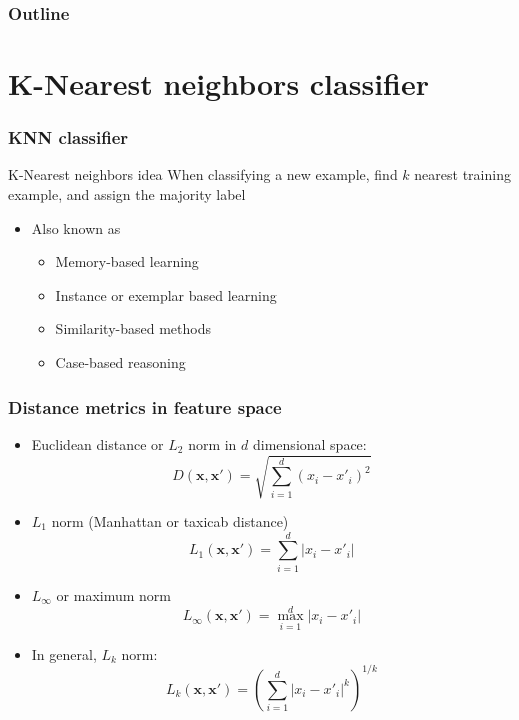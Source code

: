 \documentclass{beamer}
\author[Stroppa and Chrupala]{Grzegorz Chrupa{\l}a and Nicolas Stroppa}
\institute[UdS] %
{
Google\\
Saarland University
}
\date[2010] %
{META}
\newcommand{\x}{\mathbf{x}}
\begin{document}
\frame{\titlepage}

\begin{frame}
  \frametitle{Outline}
  \tableofcontents
\end{frame}

\section{K-Nearest neighbors classifier}

\begin{frame}
 \frametitle{KNN classifier}
\begin{block}{K-Nearest neighbors idea}
  When classifying a new example, find $k$ nearest training example,
  and assign the majority label
\end{block}
\begin{itemize}
 \item Also known as
\begin{itemize}
 \item Memory-based learning
\item Instance or exemplar based learning
\item Similarity-based methods
\item Case-based reasoning
\end{itemize}
\end{itemize}
\end{frame}

\begin{frame}
 \frametitle{Distance metrics in feature space}
\begin{itemize}
\item Euclidean distance or $L_2$ norm in $d$ dimensional space:
\[
 D(\x,\x') = \sqrt{\sum_{i=1}^d (x_i-x'_i)^2}
\]
\item $L_1$ norm (Manhattan or taxicab distance)
\[
 L_1(\x,\x') = \sum_{i=1}^d |x_i-x'_i|
\]
\item $L_{\infty}$ or maximum norm
\[
 L_{\infty}(\x,\x') = \max_{i=1}^d |x_i-x'_i|
\]
\item In general, $L_k$ norm:
\[
 L_k(\x,\x') = \left( \sum_{i=1}^d |x_i - x'_i|^k \right)^{1/k}
\]
\end{itemize}
\end{frame}
\end{document}
